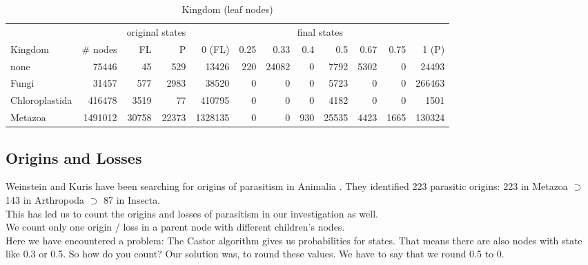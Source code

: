       \begin{table}
        \begin{center}
          \hspace*{-2cm}\begin{tabular}{ |l|r||r|r||r|r|r|r|r|r|r|r| }
            \hline
            & & \multicolumn{2}{c||}{original states} & \multicolumn{8}{c|}{final states} \\
            Kingdom & \# nodes & FL & P
              & 0 (FL) & 0.25 & 0.33 & 0.4 & 0.5 & 0.67 & 0.75 & 1 (P) \\
            \hline \hline
            none & 75446 & 45 & 529 
              & 13426 & 220 & 24082 & 0 & 7792 & 5302 & 0 & 24493 \\
            Fungi & 31457 & 577 & 2983
              & 38520 & 0 & 0 & 0 & 5723 & 0 & 0 & 266463 \\
            Chloroplastida & 416478 & 3519 & 77
              & 410795 & 0 & 0 & 0 & 4182 & 0 & 0 & 1501 \\
            Metazoa & 1491012 & 30758 & 22373
              & 1328135 & 0 & 0 & 930 & 25535 & 4423 & 1665 & 130324 \\
            \hline  
          \end{tabular}
        \end{center}
        \caption{Kingdom (leaf nodes)}
      \end{table}

    \subsection{Origins and Losses}

      Weinstein and Kuris have been searching for origins of parasitism in Animalia \cite{Weinstein2016}. 
        They identified 223 parasitic origins: 223 in Metazoa $\supset$ 143 in Arthropoda $\supset$ 87 
        in Insecta. \\
      This has led us to count the origins and losses of parasitism in our investigation as well. \\
      We count only one origin / loss in a parent node with different children's nodes. \\
      Here we have encountered a problem: The Castor algorithm gives us probabilities for states. That 
        means there are also nodes with state like 0.3 or 0.5. So how do you count? Our solution was, 
        to round these values. We have to say that we round 0.5 to 0.

